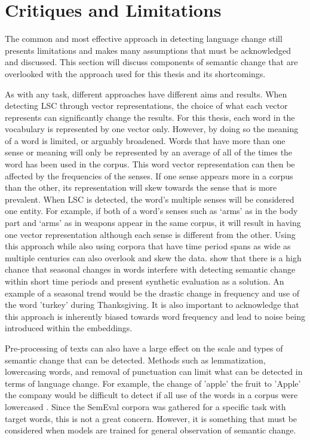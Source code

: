 \section{Critiques and Limitations}
\label{sec:critiques}

The common and most effective approach in detecting language change still presents limitations and makes many assumptions that must be acknowledged and discussed. This section will discuss components of semantic change that are overlooked with the approach used for this thesis and its shortcomings. 

As with any task, different approaches have different aims and results. When detecting LSC through vector representations, the choice of what each vector represents can significantly change the results. For this thesis, each word in the vocabulary is represented by one vector only. However, by doing so the meaning of a word is limited, or arguably broadened. Words that have more than one sense or meaning will only be represented by an average of all of the times the word has been used in the corpus. This word vector representation can then be affected by the frequencies of the senses. If one sense appears more in a corpus than the other, its representation will skew towards the sense that is more prevalent.  When LSC is detected, the word’s multiple senses will be considered one entity. For example, if both of a word’s senses such as ‘arms’ as in the body part and ‘arms’ as in weapons appear in the same corpus, it will result in having one vector representation although each sense is different from the other. Using this approach while also using corpora that have time period spans as wide as multiple centuries can also overlook and skew the data. \citet{shoemark-etal-2019-room} show that there is a high chance that seasonal changes in words interfere with detecting semantic change within short time periods and present synthetic evaluation as a solution. An example of a seasonal trend would be the drastic change in frequency and use of the word 'turkey' during Thanksgiving. It is also important to acknowledge that this approach is inherently biased towards word frequency and lead to noise being introduced within the embeddings. \citep{dubossarsky-etal-2017-outta, kaiser-etal-2020-ims, schlechtweg-etal-2020-semeval}

Pre-processing of texts can also have a large effect on the scale and types of semantic change that can be detected. Methods such as lemmatization, lowercasing words, and removal of punctuation can limit what can be detected in terms of language change. For example, the change of 'apple' the fruit to 'Apple' the company would be difficult to detect if all use of the words in a corpus were lowercased \citep{tahmasebi-survey2018}. Since the SemEval corpora was gathered for a specific task with target words, this is not a great concern. However, it is something that must be considered when models are trained for general observation of semantic change.

